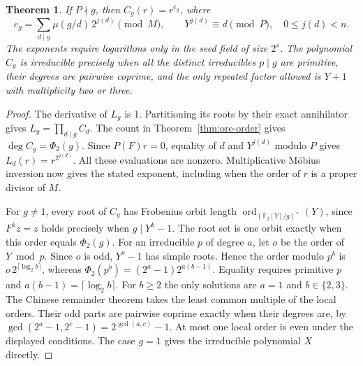 \documentclass[11pt]{article}
\newtheorem{theorem}{Theorem}
\newcommand{\F}{\mathbb F_2}
\newcommand{\ord}{\operatorname{ord}}
\begin{document}
\begin{theorem}\label{thm:ore-class-logs}
If \(P\nmid g\), then \(C_g(r)=r^{e_g}\), where
\[
 e_g=\sum_{d\mid g}\mu(g/d)\,2^{j(d)}\pmod M,\qquad
 Y^{j(d)}\equiv d\pmod P,\quad 0\le j(d)<n .
\]
The exponents require logarithms only in the seed field of size \(2^s\).
The polynomial \(C_g\) is irreducible precisely when all the distinct
irreducibles \(p\mid g\) are primitive, their degrees are pairwise
coprime, and the only repeated factor allowed is \(Y+1\) with
multiplicity two or three.
\end{theorem}
\begin{proof}
The derivative of \(L_g\) is 1. Partitioning its roots by their exact
annihilator gives \(L_g=\prod_{d\mid g} C_d\).
The count in Theorem~\ref{thm:ore-order} gives \(\deg C_g=\Phi_2(g)\).
Since \(P(F)r=0\), equality of \(d\) and \(Y^{j(d)}\) modulo \(P\)
gives \(L_d(r)=r^{2^{j(d)}}\). All these evaluations are nonzero.
Multiplicative Möbius inversion now gives the stated exponent, including
when the order of \(r\) is a proper divisor of \(M\).

For \(g\ne1\), every root of \(C_g\) has Frobenius orbit length
\(\ord_{(\F[Y]/g)^\times}(Y)\), since \(F^kz=z\) holds precisely when
\(g\mid Y^k-1\). The root set is one orbit exactly when this order equals
\(\Phi_2(g)\). For an irreducible \(p\) of degree \(a\), let \(o\) be the
order of \(Y\bmod p\). Since \(o\) is odd, \(Y^o-1\) has simple roots.
Hence the order modulo \(p^b\) is \(o\,2^{\lceil\log_2 b\rceil}\),
whereas \(\Phi_2(p^b)=(2^a-1)2^{a(b-1)}\).
Equality requires primitive \(p\) and \(a(b-1)=\lceil\log_2 b\rceil\).
For \(b\ge2\) the only solutions are \(a=1\) and \(b\in\{2,3\}\).
The Chinese remainder theorem takes the least common multiple of the local
orders. Their odd parts are pairwise coprime exactly when their degrees
are, by \(\gcd(2^a-1,2^c-1)=2^{\gcd(a,c)}-1\). At most one local
order is even under the displayed conditions. The case \(g=1\) gives
the irreducible polynomial \(X\) directly.
\end{proof}
\end{document}
